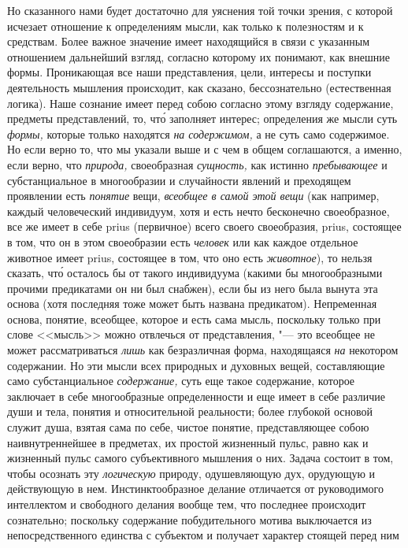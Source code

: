 Но сказанного нами будет достаточно для уяснения той точки зрения, с которой
исчезает отношение к определениям мысли, как только к полезностям и к
средствам. Более важное значение имеет находящийся в связи с указанным
отношением дальнейший взгляд, согласно которому их понимают, как внешние формы.
Проникающая все наши представления, цели, интересы и поступки деятельность
мышления происходит, как сказано, бессознательно (естественная логика). Наше
сознание имеет перед собою согласно этому взгляду содержание, предметы
представлений, то, чт\'{о} заполняет интерес; определения же мысли суть
{\em формы,} которые только находятся {\em на содержимом,} а не суть само
содержимое. Но если верно то, что мы указали выше и с чем в общем соглашаются,
а именно, если верно, что {\em природа,} своеобразная {\em сущность,} как
истинно {\em пребывающее} и субстанциальное в многообразии и случайности
явлений и преходящем проявлении есть {\em понятие} вещи, {\em всеобщее в самой
этой вещи} (как например, каждый человеческий индивидуум, хотя и есть нечто
бесконечно своеобразное, все же имеет в себе prius (первичное) всего своего
своеобразия, prius, состоящее в том, что он в этом своеобразии есть
{\em человек} или как каждое отдельное животное имеет prius, состоящее в том,
что оно есть {\em животное}), то нельзя сказать, чт\'{о} осталось бы от такого
индивидуума (какими бы многообразными прочими предикатами он ни был снабжен),
если бы из него была вынута эта основа (хотя последняя тоже может быть названа
предикатом). Непременная основа, понятие, всеобщее, которое и есть сама мысль,
поскольку только при слове <<мысль>> можно отвлечься от представления, "--- это
всеобщее не может рассматриваться {\em лишь} как безразличная форма,
находящаяся {\em на} некотором содержании. Но эти мысли всех природных и
духовных вещей, составляющие само субстанциальное {\em содержание,} суть еще
такое содержание, которое заключает в себе многообразные определенности и еще
имеет в себе различие души и тела, понятия и относительной реальности; более
глубокой основой служит душа, взятая сама по себе, чистое понятие,
представляющее собою наивнутреннейшее в предметах, их простой жизненный пульс,
равно как и жизненный пульс самого субъективного мышления о них. Задача состоит
в том, чтобы осознать эту {\em логическую} природу, одушевляющую дух, орудующую
и действующую в нем. Инстинктообразное делание отличается от руководимого
интеллектом и свободного делания вообще тем, что последнее происходит
сознательно; поскольку содержание побудительного мотива выключается из
непосредственного единства с субъектом и получает характер стоящей перед ним
